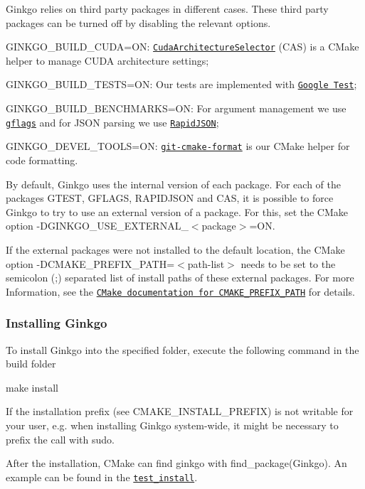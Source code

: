 Ginkgo relies on third party packages in different cases. These third party packages can be turned off by disabling the relevant options.


\begin{DoxyItemize}
\item G\+I\+N\+K\+G\+O\+\_\+\+B\+U\+I\+L\+D\+\_\+\+C\+U\+DA=ON\+: \href{https://github.com/ginkgo-project/CudaArchitectureSelector}{\tt Cuda\+Architecture\+Selector} (C\+AS) is a C\+Make helper to manage C\+U\+DA architecture settings;
\item G\+I\+N\+K\+G\+O\+\_\+\+B\+U\+I\+L\+D\+\_\+\+T\+E\+S\+TS=ON\+: Our tests are implemented with \href{https://github.com/google/googletest}{\tt Google Test};
\item G\+I\+N\+K\+G\+O\+\_\+\+B\+U\+I\+L\+D\+\_\+\+B\+E\+N\+C\+H\+M\+A\+R\+KS=ON\+: For argument management we use \href{https://github.com/gflags/gflags}{\tt gflags} and for J\+S\+ON parsing we use \href{https://github.com/Tencent/rapidjson}{\tt Rapid\+J\+S\+ON};
\item G\+I\+N\+K\+G\+O\+\_\+\+D\+E\+V\+E\+L\+\_\+\+T\+O\+O\+LS=ON\+: \href{https://github.com/gflegar/git-cmake-format}{\tt git-\/cmake-\/format} is our C\+Make helper for code formatting.
\end{DoxyItemize}

By default, Ginkgo uses the internal version of each package. For each of the packages {\ttfamily G\+T\+E\+ST}, {\ttfamily G\+F\+L\+A\+GS}, {\ttfamily R\+A\+P\+I\+D\+J\+S\+ON} and {\ttfamily C\+AS}, it is possible to force Ginkgo to try to use an external version of a package. For this, set the C\+Make option {\ttfamily -\/\+D\+G\+I\+N\+K\+G\+O\+\_\+\+U\+S\+E\+\_\+\+E\+X\+T\+E\+R\+N\+A\+L\+\_\+$<$package$>$=ON}.

If the external packages were not installed to the default location, the C\+Make option {\ttfamily -\/\+D\+C\+M\+A\+K\+E\+\_\+\+P\+R\+E\+F\+I\+X\+\_\+\+P\+A\+TH=$<$path-\/list$>$} needs to be set to the semicolon ({\ttfamily ;}) separated list of install paths of these external packages. For more Information, see the \href{https://cmake.org/cmake/help/v3.9/variable/CMAKE_PREFIX_PATH.html}{\tt C\+Make documentation for C\+M\+A\+K\+E\+\_\+\+P\+R\+E\+F\+I\+X\+\_\+\+P\+A\+TH} for details.

\subsubsection*{Installing Ginkgo}

To install Ginkgo into the specified folder, execute the following command in the build folder


\begin{DoxyCode}
make install
\end{DoxyCode}


If the installation prefix (see {\ttfamily C\+M\+A\+K\+E\+\_\+\+I\+N\+S\+T\+A\+L\+L\+\_\+\+P\+R\+E\+F\+IX}) is not writable for your user, e.\+g. when installing Ginkgo system-\/wide, it might be necessary to prefix the call with {\ttfamily sudo}.

After the installation, C\+Make can find ginkgo with {\ttfamily find\+\_\+package(\+Ginkgo)}. An example can be found in the \href{test_install/CMakeLists.txt}{\tt {\ttfamily test\+\_\+install}}. 